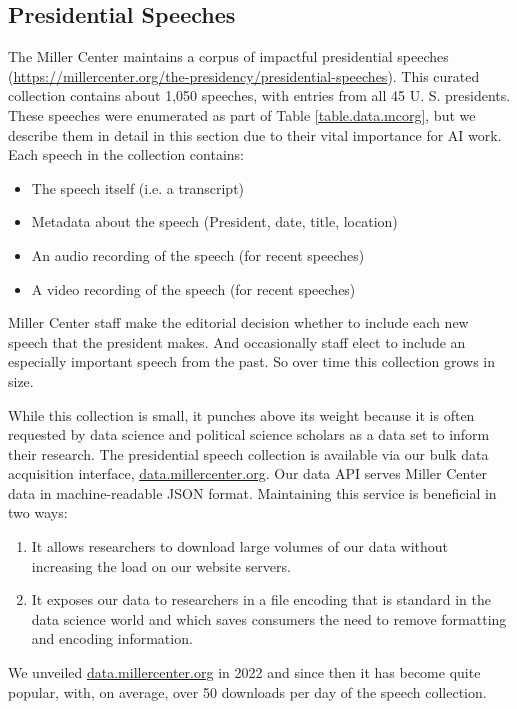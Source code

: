 \documentclass[12pt, oneside]{article}   	%
\begin{document}
\subsection{Presidential Speeches}\label{section.data.speeches}
The Miller Center maintains a corpus of impactful presidential speeches (\href{https://millercenter.org/the-presidency/presidential-speeches}{https://millercenter.org/the-presidency/presidential-speeches}).  This curated collection contains about 1,050 speeches, with entries from all 45 U. S. presidents.  These speeches were enumerated as part of Table \ref{table.data.mcorg}, but we describe them in detail in this section due to their vital importance for AI work.  Each speech in the collection contains:
\begin{itemize}
\item The speech itself (i.e. a transcript)
\item Metadata about the speech (President, date, title, location)
\item An audio recording of the speech (for recent speeches)
\item A video recording of the speech (for recent speeches)
\end{itemize}
Miller Center staff make the editorial decision whether to include each new speech that the president makes.  And occasionally staff elect to include an especially important speech from the past.  So over time this collection grows in size.

While this collection is small, it punches above its weight because it is often requested by data science and political science scholars as a data set to inform their research.  The presidential speech collection is available  via our bulk data acquisition interface, \href{data.millercenter.org}{data.millercenter.org}.  Our data API serves Miller Center data in machine-readable JSON format.  Maintaining this service is beneficial in two ways:
\begin{enumerate}
\item It allows researchers to download large volumes of our data without increasing the load on our website servers.
\item It exposes our data to researchers in  a file encoding that is standard in the data science world and which saves consumers the need to remove formatting and encoding information.
\end{enumerate}
We unveiled \href{http://data.millercenter.org}{data.millercenter.org} in 2022 and since then it has become quite popular, with, on average, over 50 downloads per day of the speech collection.
\end{document}
